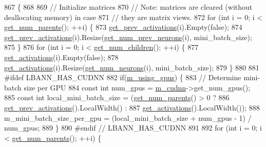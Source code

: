 \begin{DoxyCode}
867                                              \{
868 
869   \textcolor{comment}{// Initialize matrices}
870   \textcolor{comment}{// Note: matrices are cleared (without deallocating memory) in case}
871   \textcolor{comment}{// they are matrix views.}
872   \textcolor{keywordflow}{for} (\textcolor{keywordtype}{int} i = 0; i < \hyperlink{classlbann_1_1Layer_ac9290d4a6453ccda5f6b4d8b57b49ba3}{get\_num\_parents}(); ++i) \{
873     \hyperlink{classlbann_1_1Layer_a45853df73a2e72bfaa774665a0f37ed7}{get\_prev\_activations}(i).Empty(\textcolor{keyword}{false});
874     \hyperlink{classlbann_1_1Layer_a45853df73a2e72bfaa774665a0f37ed7}{get\_prev\_activations}(i).Resize(\hyperlink{classlbann_1_1Layer_a27112eb70bbfbd7f3c3e749960400dec}{get\_num\_prev\_neurons}(i), 
      mini\_batch\_size);
875   \}
876   \textcolor{keywordflow}{for} (\textcolor{keywordtype}{int} i = 0; i < \hyperlink{classlbann_1_1Layer_a1409a117c31a7ea4f2c7a4d22a3e86c3}{get\_num\_children}(); ++i) \{
877     \hyperlink{classlbann_1_1Layer_a1134b1a4385af199d7272c5aa827fa99}{get\_activations}(i).Empty(\textcolor{keyword}{false});
878     \hyperlink{classlbann_1_1Layer_a1134b1a4385af199d7272c5aa827fa99}{get\_activations}(i).Resize(\hyperlink{classlbann_1_1Layer_aa4de686cc6c2dd38166f42faf874f227}{get\_num\_neurons}(i), mini\_batch\_size);
879   \}
880 
881 \textcolor{preprocessor}{  #ifdef LBANN\_HAS\_CUDNN}
882   \textcolor{keywordflow}{if}(\hyperlink{classlbann_1_1Layer_af7881cb5eff5207c15fa835d65462e8f}{m\_using\_gpus}) \{
883     \textcolor{comment}{// Determine mini-batch size per GPU}
884     \textcolor{keyword}{const} \textcolor{keywordtype}{int} num\_gpus = \hyperlink{classlbann_1_1Layer_a08dbb94239e3b8c96329786c57c72e21}{m\_cudnn}->get\_num\_gpus();
885     \textcolor{keyword}{const} \textcolor{keywordtype}{int} local\_mini\_batch\_size = (\hyperlink{classlbann_1_1Layer_ac9290d4a6453ccda5f6b4d8b57b49ba3}{get\_num\_parents}() > 0 ?
886                                        \hyperlink{classlbann_1_1Layer_a45853df73a2e72bfaa774665a0f37ed7}{get\_prev\_activations}().LocalWidth() :
887                                        \hyperlink{classlbann_1_1Layer_a1134b1a4385af199d7272c5aa827fa99}{get\_activations}().LocalWidth());
888     m\_mini\_batch\_size\_per\_gpu = (local\_mini\_batch\_size + num\_gpus - 1) / num\_gpus;
889   \}
890 \textcolor{preprocessor}{  #endif // LBANN\_HAS\_CUDNN}
891 
892   \textcolor{keywordflow}{for} (\textcolor{keywordtype}{int} i = 0; i < \hyperlink{classlbann_1_1Layer_ac9290d4a6453ccda5f6b4d8b57b49ba3}{get\_num\_parents}(); ++i) \{

\end{DoxyCode}
